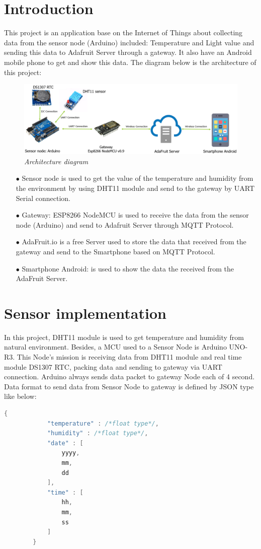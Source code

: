 \documentclass[13pt,a4paper]{article}
\begin{document}
	
	\newpage
	\tableofcontents
	\newpage
	\section{Introduction}
	This project is an application base on the Internet of Things about collecting data from the sensor node (Arduino) included: Temperature and Light value and sending this data to Adafruit Server through a gateway. It also have an Android mobile phone to get and show this data.
	The diagram below is the architecture of this project: 
	\begin{figure}[h!]
		\begin{center}
			\includegraphics[width=15cm]{architechture.png}
			\caption{\textit{Architecture diagram}}
			\label{h1}
		\end{center}
	\end{figure}
	\begin{enumerate}
		\item[$\bullet$] Sensor node is used to get the value of the temperature and humidity from the environment by using DHT11 module and send to the gateway by UART Serial connection.
		\item[$\bullet$] Gateway: ESP8266 NodeMCU is used to receive the data from the sensor node (Arduino) and send to Adafruit Server through MQTT Protocol.
		\item[$\bullet$] AdaFruit.io is a free Server used to store the data that received from the gateway and send to the Smartphone based on MQTT Protocol.
		\item[$\bullet$] Smartphone Android: is used to show the data the received from the AdaFruit Server.
	\end{enumerate}
	
	\section{Sensor implementation}
	In this project, DHT11 module is used to get temperature and humidity from natural environment. Besides, a MCU used to a Sensor Node is Arduino UNO-R3. This Node's mission is receiving data from DHT11 module and real time module DS1307 RTC, packing data and sending to gateway via UART connection. Arduino always sends data packet to gateway Node each of 4 second.\\
	Data format to send data from Sensor Node to gateway is defined by JSON type like below:
	\begin{lstlisting}[language=C, caption= Json Data Format, label=test_float]
		{
			"temperature" : /*float type*/,
			"humidity" : /*float type*/,
			"date" : [
				yyyy,
				mm,
				dd
			],
			"time" : [
				hh,
				mm,
				ss
			]
		}
	\end{lstlisting}
	
\end{document}
